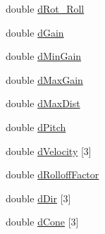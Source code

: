 \begin{DoxyCompactItemize}
\item 
double \hyperlink{classs13_sound_afc60f84c5d2c1002a09857962914482e}{d\-Rot\-\_\-\-Roll}
\item 
double \hyperlink{classs13_sound_a87d4788a4585e0f59b49476e3b45257b}{d\-Gain}
\item 
double \hyperlink{classs13_sound_a62de5f4d90ac13d1f129a464c6a1febe}{d\-Min\-Gain}
\item 
double \hyperlink{classs13_sound_adc5d5f80ee7e0870a94884ce53b8db71}{d\-Max\-Gain}
\item 
double \hyperlink{classs13_sound_a753b8a3ce3dd750d24f333760eae1fbd}{d\-Max\-Dist}
\item 
double \hyperlink{classs13_sound_ade63b7eb0c4fa73dd9f83c462bb5dae4}{d\-Pitch}
\item 
double \hyperlink{classs13_sound_a28134d595c67523cb7aa66dc1970a2d2}{d\-Velocity} \mbox{[}3\mbox{]}
\item 
double \hyperlink{classs13_sound_a4b369b73526f9e7c6451859fac6c944f}{d\-Rolloff\-Factor}
\item 
double \hyperlink{classs13_sound_ae1f6a8bde58d498f905e09416c94edbf}{d\-Dir} \mbox{[}3\mbox{]}
\item 
double \hyperlink{classs13_sound_ae84d654b33b2f3e27116f658e7fc6460}{d\-Cone} \mbox{[}3\mbox{]}
\end{DoxyCompactItemize}


